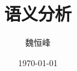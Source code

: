 \documentclass[]{beamer}
\title[语义分析]{语义分析}
\author[魏恒峰]{\large 魏恒峰}
\institute{hfwei@nju.edu.cn}
\date{\today}
\begin{document}
\maketitle






\thankyou{}

\end{document}
